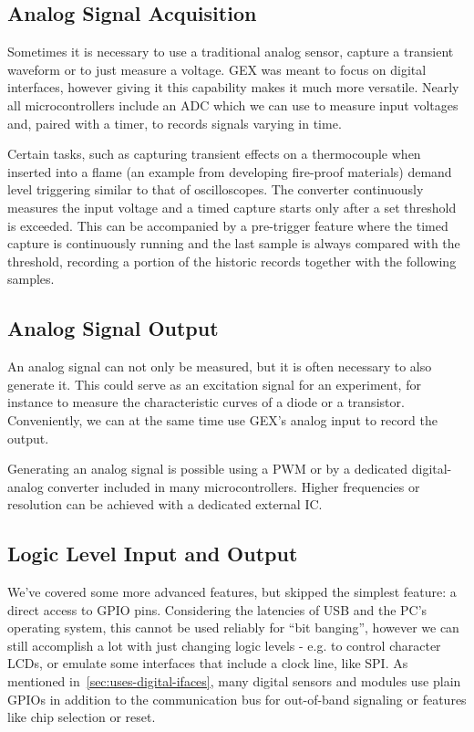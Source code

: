 \subsection{Analog Signal Acquisition}

Sometimes it is necessary to use a traditional analog sensor, capture a transient waveform or to just measure a voltage. GEX was meant to focus on digital interfaces, however giving it this capability makes it much more versatile. Nearly all microcontrollers include an \gls{ADC} which we can use to measure input voltages and, paired with a timer, to records signals varying in time.

Certain tasks, such as capturing transient effects on a thermocouple when inserted into a flame (an example from developing fire-proof materials) demand level triggering similar to that of oscilloscopes. The converter continuously measures the input voltage and a timed capture starts only after a set threshold is exceeded. This can be accompanied by a pre-trigger feature where the timed capture is continuously running and the last sample is always compared with the threshold, recording a portion of the historic records together with the following samples.

\subsection{Analog Signal Output}

An analog signal can not only be measured, but it is often necessary to also generate it. This could serve as an excitation signal for an experiment, for instance to measure the characteristic curves of a diode or a transistor. Conveniently, we can at the same time use GEX's analog input to record the output.

Generating an analog signal is possible using a \gls{PWM} or by a dedicated digital-analog converter included in many microcontrollers. Higher frequencies or resolution can be achieved with a dedicated external \gls{IC}.

\subsection{Logic Level Input and Output}

We've covered some more advanced features, but skipped the simplest feature: a direct access to \gls{GPIO} pins. Considering the latencies of \gls{USB} and the \gls{PC}'s operating system, this cannot be used reliably for ``bit banging'', however we can still accomplish a lot with just changing logic levels - e.g. to control character \glspl{LCD}, or emulate some interfaces that include a clock line, like \gls{SPI}. As mentioned in~\ref{sec:uses-digital-ifaces}, many digital sensors and modules use plain \glspl{GPIO} in addition to the communication bus for out-of-band signaling or features like chip selection or reset.

